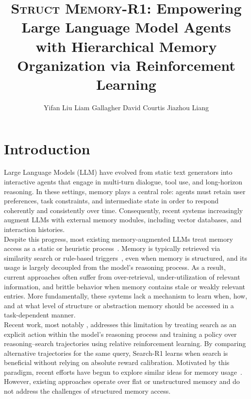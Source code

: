 \documentclass{article}
\title{\textsc{Struct Memory-R1}: Empowering Large Language Model Agents with Hierarchical Memory Organization via Reinforcement Learning}
\author{
  Yifan Liu \And Liam Gallagher \And David Courtis \And Jiazhou Liang
}
\theoremstyle{definition}
\begin{document}
\maketitle

\section{Introduction}
Large Language Models (LLM) have evolved from static text generators into interactive agents that engage in multi-turn dialogue, tool use, and long-horizon reasoning. In these settings, memory plays a central role: agents must retain user preferences, task constraints, and intermediate state in order to respond coherently and consistently over time. Consequently, recent systems increasingly augment LLMs with external memory modules, including vector databases, and interaction histories.\\

Despite this progress, most existing memory-augmented LLMs treat memory access as a static or heuristic process~\citep{lewis2020retrieval}. Memory is typically retrieved via similarity search or rule-based triggers~\citep{khandelwal2020generalization}, even when memory is structured, and its usage is largely decoupled from the model’s reasoning process. As a result, current approaches often suffer from over-retrieval, under-utilization of relevant information, and brittle behavior when memory contains stale or weakly relevant entries. More fundamentally, these systems lack a mechanism to learn when, how, and at what level of structure or abstraction memory should be accessed in a task-dependent manner.\\

Recent work, most notably \citet{jin2025search}, addresses this limitation by treating search as an explicit action within the model’s reasoning process and training a policy over reasoning–search trajectories using relative reinforcement learning. By comparing alternative trajectories for the same query, Search-R1 learns when search is beneficial without relying on absolute reward calibration. Motivated by this paradigm, recent efforts have begun to explore similar ideas for memory usage~\citep{yan2025memory}. However, existing approaches operate over flat or unstructured memory and do not address the challenges of structured memory access.\\
\end{document}
